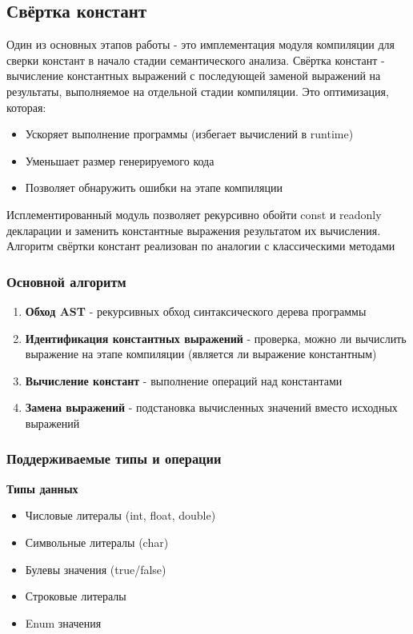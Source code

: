 \subsection{Свёртка констант}
Один из основных этапов работы - это имплементация модуля компиляции для сверки констант в начало стадии семантического анализа.
Свёртка констант - вычисление константных выражений с последующей заменой выражений на результаты,
выполняемое на отдельной стадии компиляции. Это оптимизация, которая:
\begin{itemize}[label={--}]
    \item Ускоряет выполнение программы (избегает вычислений в runtime)
    \item Уменьшает размер генерируемого кода
    \item Позволяет обнаружить ошибки на этапе компиляции
\end{itemize}

Исплементированный модуль позволяет рекурсивно обойти const и readonly декларации и заменить константные выражения результатом их вычисления. Алгоритм свёртки констант реализован по аналогии с классическими методами \cite{aho2007}
\subsubsection{Основной алгоритм}
\begin{enumerate}[label={--}]
    \item \textbf{Обход AST} - рекурсивных обход синтаксического дерева программы
    \item \textbf{Идентификация константных выражений} - проверка, можно ли вычислить выражение на этапе компиляции (является ли выражение константным)
    \item \textbf{Вычисление констант} - выполнение операций над константами
    \item \textbf{Замена выражений} - подстановка вычисленных значений вместо исходных выражений
\end{enumerate}

\subsubsection{Поддерживаемые типы и операции}
\textbf{Типы данных}
\begin{itemize}[label={--}]
    \item Числовые литералы (int, float, double)
    \item Символьные литералы (char)
    \item Булевы значения (true/false)
    \item Строковые литералы
    \item Enum значения
\end{itemize}

